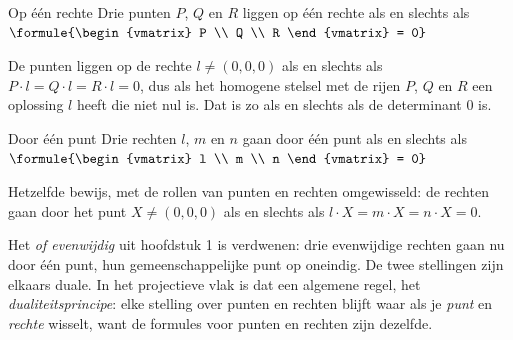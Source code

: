 \begin{theorie}
\begin{stelling}{Op één rechte}
Drie punten $P$, $Q$ en $R$ liggen op één rechte als en slechts als \qquad $\formule{\begin{vmatrix} P \\ Q \\ R \end{vmatrix} = 0}$
\end{stelling}

\begin{bewijs}
De punten liggen op de rechte $l \neq (0, 0, 0)$ als en slechts als $P \cdot l = Q \cdot l = R \cdot l = 0$, dus als het homogene stelsel met de rijen $P$, $Q$ en $R$ een oplossing $l$ heeft die niet nul is. Dat is zo als en slechts als de determinant 0 is.
\end{bewijs}
\end{theorie}

\begin{theorie}
\begin{stelling}{Door één punt}
Drie rechten $l$, $m$ en $n$ gaan door één punt als en slechts als \qquad $\formule{\begin{vmatrix} l \\ m \\ n \end{vmatrix} = 0}$
\end{stelling}

\begin{bewijs}
Hetzelfde bewijs, met de rollen van punten en rechten omgewisseld: de rechten gaan door het punt $X \neq (0, 0, 0)$ als en slechts als $l \cdot X = m \cdot X = n \cdot X = 0$.
\end{bewijs}
\end{theorie}

Het \textit{of evenwijdig} uit hoofdstuk 1 is verdwenen: drie evenwijdige rechten gaan nu door één punt, hun gemeenschappelijke punt op oneindig. De twee stellingen zijn elkaars duale. In het projectieve vlak is dat een algemene regel, het \emph{dualiteitsprincipe}: elke stelling over punten en rechten blijft waar als je \textit{punt} en \textit{rechte} wisselt, want de formules voor punten en rechten zijn dezelfde.



